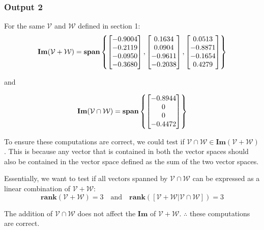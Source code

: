 \documentclass[10pt]{article}
\begin{document}
\subsubsection{Output 2}
For the same $\mathcal{V}$ and $\mathcal{W}$ defined in section 1:
\begin{equation*}
    \mathbf{Im}({\mathcal{V} + \mathcal{W}}) = \mathbf{span}
    \begin{Bmatrix}
        \begin{bmatrix} -0.9004\\-0.2119\\-0.0950\\-0.3680 \end{bmatrix},
        \begin{bmatrix} 0.1634\\0.0904\\-0.9611\\-0.2038 \end{bmatrix},
        \begin{bmatrix} 0.0513\\-0.8871\\-0.1654\\0.4279 \end{bmatrix}
    \end{Bmatrix}
\end{equation*}
\begin{center}
    and
\end{center}
\begin{equation*}
    \mathbf{Im}({\mathcal{V} \cap \mathcal{W}}) = \mathbf{span}
    \begin{Bmatrix}
        \begin{bmatrix} -0.8944\\0\\0\\-0.4472 \end{bmatrix}
    \end{Bmatrix}
\end{equation*}

To ensure these computations are correct, we could test if ${\mathcal{V} \cap \mathcal{W}} \in \mathbf{Im}({\mathcal{V} + \mathcal{W}})$. This is because any vector that is contained in both the vector spaces should also be contained in the vector space defined as the sum of the two vector spaces.

Essentially, we want to test if all vectors spanned by ${\mathcal{V} \cap \mathcal{W}}$ can be expressed as a linear combination of $\mathcal{V} + \mathcal{W}$:
\begin{equation*}
    \mathbf{rank}(\mathcal{V} + \mathcal{W}) = 3
    \quad
    \text{and}
    \quad
    \mathbf{rank}([ \mathcal{V} + \mathcal{W} | \mathcal{V} \cap \mathcal{W}]) = 3
\end{equation*}

The addition of $\mathcal{V} \cap \mathcal{W}$ does not affect the $\mathbf{Im}$ of $\mathcal{V} + \mathcal{W}$. $\therefore$ these computations are correct. 
\end{document}

